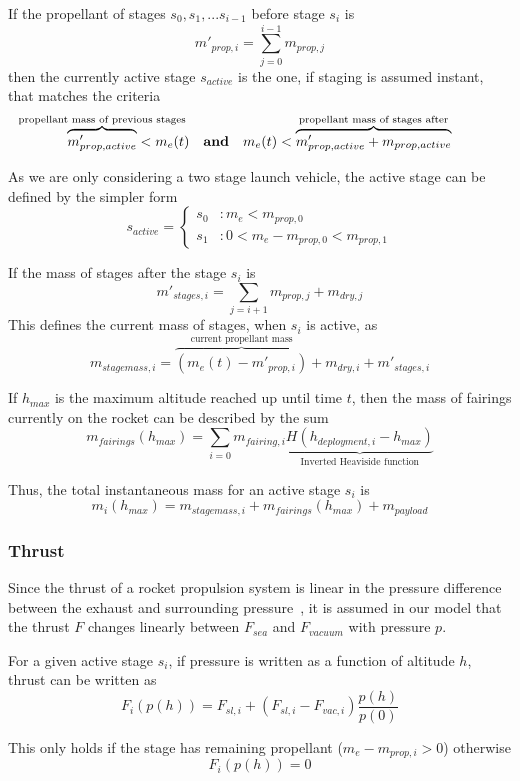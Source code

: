 \documentclass[11pt]{article}
\begin{document}
If the propellant of stages $s_0,s_1,...s_{i-1}$ before stage $s_i$ is
$$
m'_{prop,i} = \sum_{j=0}^{i-1} m_{prop,j}
$$
then the currently active stage $s_{active}$ is the one, if staging is assumed instant, that matches the criteria
$$
  \overbrace{m'_{prop,active}}^{\mathclap{\text{propellant mass of previous stages}}} < m_e(t)  \quad
  \textbf{and} \quad
  m_e(t) < \overbrace{m'_{prop,active} + m_{prop,active}}^{\mathclap{\text{propellant mass of stages after}}}
$$

As we are only considering a two stage launch vehicle, the active stage can be defined by the simpler form
$$
s_{active} = \begin{cases} 
  s_0 & : m_e < m_{prop,0} \\
  s_1 & : 0 < m_e - m_{prop,0} < m_{prop,1}
\end{cases}
$$

If the mass of stages after the stage $s_i$ is
$$
m'_{stages,i} = \sum_{j=i+1} m_{prop,j} + m_{dry,j}
$$
This defines the current mass of stages, when $s_{i}$ is active, as
$$
m_{stagemass,i} = \overbrace{\left( m_e(t) - m'_{prop,i} \right)}^{\text{current propellant mass}} + m_{dry,i} + m'_{stages,i}
$$

If $h_{max}$ is the maximum altitude reached up until time $t$, then the mass of fairings currently on the rocket can be described by the sum
$$
m_{fairings}(h_{max}) = \sum_{i=0} m_{fairing,i} \underbrace{H(h_{deployment,i} - h_{max})}_{\text{Inverted Heaviside function}}
$$

Thus, the total instantaneous mass for an active stage $s_i$ is
$$
m_i(h_{max}) = m_{stagemass,i} + m_{fairings}(h_{max}) + m_{payload}
$$

\subsubsection{Thrust}

Since the thrust of a rocket propulsion system is linear in the pressure difference between the exhaust and surrounding pressure~\cite{thrust}, 
it is assumed in our model that the thrust $F$ changes linearly between $F_{sea}$ and $F_{vacuum}$ with pressure $p$.
%
%

For a given active stage $s_i$, if pressure is written as a function of altitude $h$, thrust can be written as 
$$
F_i(p(h)) = F_{sl,i} + \left( F_{sl,i} - F_{vac,i} \right) \frac{p(h)}{p(0)}
$$

This only holds if the stage has remaining propellant ($m_e - m_{prop,i} > 0$) 
otherwise 
$$
F_i(p(h)) = 0
$$
\end{document}
